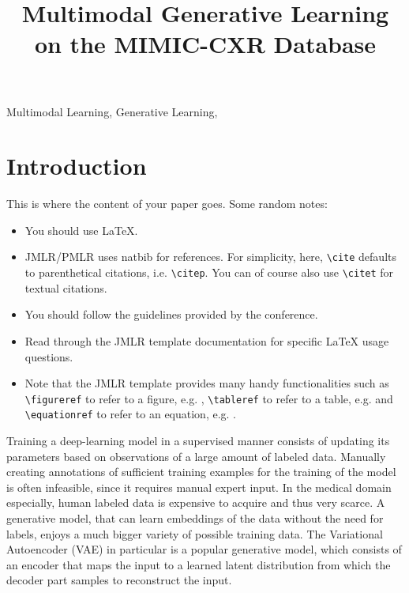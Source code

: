 \documentclass{midl} %
\title[Multimodal Generative Learning on the MIMIC-CXR Database]{Multimodal Generative Learning on the MIMIC-CXR Database}
\begin{document}
\maketitle



\begin{keywords}
Multimodal Learning, Generative Learning, 
\end{keywords}

\section{Introduction}

This is where the content of your paper goes.  Some random notes:
\begin{itemize}
\item You should use \LaTeX \cite{Lamport:Book:1989}.
\item JMLR/PMLR uses natbib for references. For simplicity, here, \verb|\cite|  defaults to
  parenthetical citations, i.e. \verb|\citep|. You can of course also
  use \verb|\citet| for textual citations.
\item You should follow the guidelines provided by the conference.
\item Read through the JMLR template documentation for specific \LaTeX
  usage questions.
\item Note that the JMLR template provides many handy functionalities
such as \verb|\figureref| to refer to a figure,
e.g. ,  \verb|\tableref| to refer to a table,
e.g.  and \verb|\equationref| to refer to an equation,
e.g. .
\end{itemize}

    Training a deep-learning model in a supervised manner consists of updating its parameters based on observations of a large amount of labeled data.
	Manually creating annotations of sufficient training examples for the training of the model is often infeasible, since it requires manual expert input.
	In the medical domain especially, human labeled data is expensive to acquire and thus very scarce.
	A generative model, that can learn embeddings of the data without the need for labels, enjoys a much bigger variety of possible training data.
	The Variational Autoencoder (VAE) \cite{doersch2016tutorial} in particular is a popular generative model, which consists of an encoder that maps the input to a learned latent distribution from which the decoder part samples to reconstruct the input.
\end{document}
